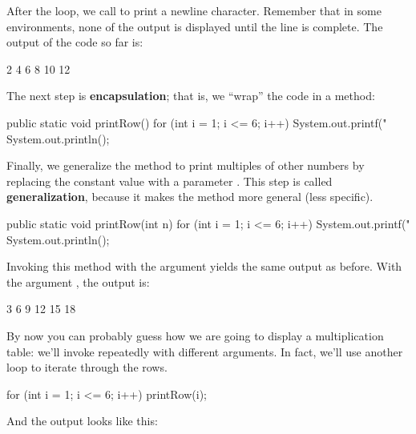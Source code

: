 After the loop, we call  to print a newline character.
Remember that in some environments, none of the output is displayed until the line is complete.
The output of the code so far is:

\begin{stdout}
   2   4   6   8  10  12
\end{stdout}


The next step is {\bf encapsulation}; that is, we ``wrap'' the code in a method:

\begin{code}
public static void printRow() {
    for (int i = 1; i <= 6; i++) {
        System.out.printf("%
    }
    System.out.println();
}
\end{code}


Finally, we generalize the method to print multiples of other numbers by replacing the constant value  with a parameter .
This step is called {\bf generalization}, because it makes the method more general (less specific).

\begin{code}
public static void printRow(int n) {
    for (int i = 1; i <= 6; i++) {
        System.out.printf("%
    }
    System.out.println();
}
\end{code}

Invoking this method with the argument  yields the same output as before.
With the argument , the output is:

\begin{stdout}
   3   6   9  12  15  18
\end{stdout}

%

By now you can probably guess how we are going to display a multiplication table: we'll invoke  repeatedly with different arguments.
In fact, we'll use another loop to iterate through the rows.

\begin{code}
for (int i = 1; i <= 6; i++) {
    printRow(i);
}
\end{code}

And the output looks like this:


